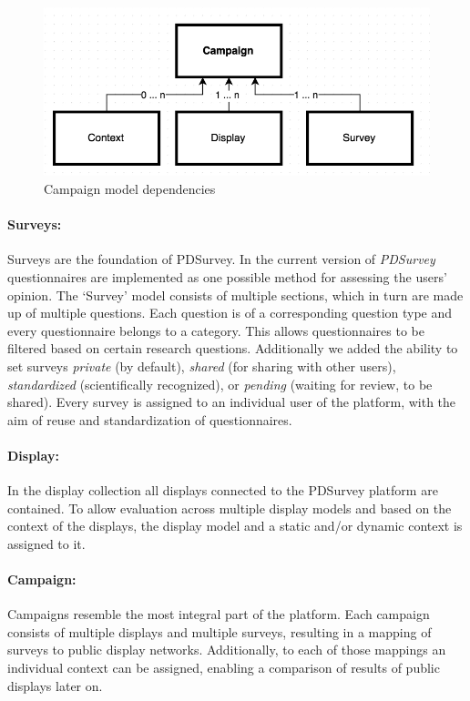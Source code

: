 \begin{figure}[bph]
    \begin{center}
        \includegraphics[width=.8\columnwidth]{img/4_implementation/4-dependency-campaign}
    \end{center}
 \caption{Campaign model dependencies}
 \label{fig:4-dependency-campaign}
\end{figure}


	\paragraph{Surveys:} Surveys are the foundation of PDSurvey. In the current version of \textit{PDSurvey} questionnaires are implemented as one possible method for assessing the users' opinion. The `Survey' model consists of multiple sections, which in turn are made up of multiple questions. Each question is of a corresponding question type and every questionnaire belongs to a category. This allows questionnaires to be filtered based on certain research questions. Additionally we added the ability to set surveys \textit{private} (by default), \textit{shared} (for sharing with other users), \textit{standardized} (scientifically recognized), or \textit{pending} (waiting for review, to be shared). Every survey is assigned to an individual user of the platform, with the aim of reuse and standardization of questionnaires.

	\paragraph{Display:} In the display collection all displays connected to the PDSurvey platform are contained. To allow evaluation across multiple display models and based on the context of the displays, the display model and a static and/or dynamic context is assigned to it.

	\paragraph{Campaign:} Campaigns resemble the most integral part of the platform. Each campaign consists of multiple displays and multiple surveys, resulting in a mapping of  surveys to public display networks. Additionally, to each of those mappings an individual context can be assigned, enabling a comparison of results of public displays later on.

